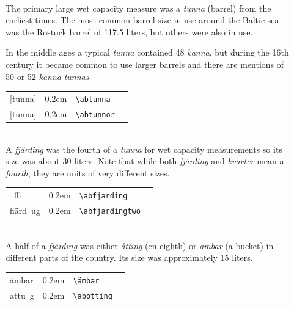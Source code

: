 \documentclass[a4paper]{article}
\newcommand{\samplefont}{\fontsize{16}{16}\abcursivefamily\spaceskip0.2em}
\newcommand{\sample}[1]{{\samplefont #1 \strut}}
\newcommand{\ltxncmd}[1]{\texttt{\textbackslash{}#1}}
\begin{document}
\begin{description}
\item [\sample{\abtunna}, \sample{\abtunnor} \emph{tunna}, \emph{tynnyri}] \mbox{} \\
  The primary large wet capacity measure was a \emph{tunna} (barrel)
  from the earliest times. The most common barrel size in use around
  the Baltic sea was the Rostock barrel of 117.5 liters, but others
  were also in use. 

  In the middle ages a typical \emph{tunna} contained 48 \emph{kanna},
  but during the 16th century it became common to use larger barrels
  and there are mentions of 50 or 52 \emph{kanna} \emph{tunnas}.
  \begin{center}
    \begin{tabular}{llll}
      {}[tunna] & \sample{\abtunna} & \ltxncmd{abtunna} \\
      {}[tunna] & \sample{\abtunnor} & \ltxncmd{abtunnor} \\
    \end{tabular}
  \end{center}
  

\item [\sample{\abfjarding}, \sample{\abfjardingtwo} \emph{fjärding}, \emph{nelikko}, \emph{neljännes}] \mbox{} \\
  A \emph{fjärding} was the fourth of a \emph{tunna} for wet capacity
  measurements so its size was about 30 liters. Note that while both
  \emph{fjärding} and \emph{kvarter} mean a \emph{fourth}, they are
  units of very different sizes. 
  \begin{center}
    \begin{tabular}{llll}
      {}~ffi & \sample{\abfjarding} & \ltxncmd{abfjarding} \\
      {}fiärd~ug & \sample{\abfjardingtwo} & \ltxncmd{abfjardingtwo} \\
    \end{tabular}
  \end{center}


\item [\sample{\abambar}, \sample{\abotting} \emph{ämbar},
  \emph{åtting}, \emph{ämpäri}  ] \mbox{} \\
  A half of a \emph{fjärding} was either \emph{åtting} (en eighth) or
  \emph{ämbar} (a bucket) in different parts of the country. Its size
  was approximately 15 liters. 
  \begin{center}
    \begin{tabular}{llll}
      {}ämbar & \sample{\abambar} & \ltxncmd{ämbar} \\
      {}attu~g & \sample{\abotting} & \ltxncmd{abotting} \\
    \end{tabular}
  \end{center}



\end{description}
\end{document}
